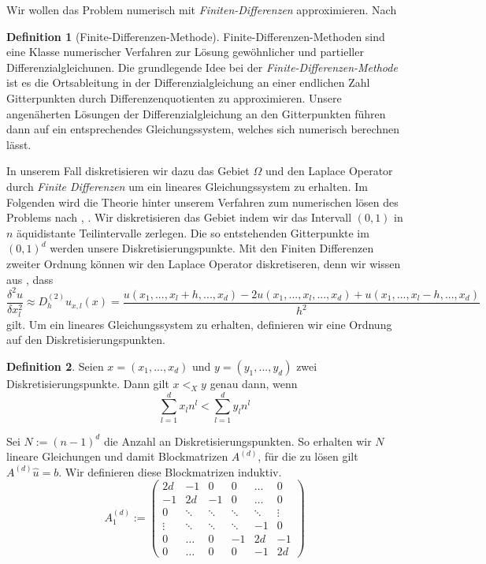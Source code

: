 \documentclass[smallheadings]{scrartcl}
\theoremstyle{definition}
\newtheorem{definition}{Definition}[section]
\begin{document}
		Wir wollen das Problem numerisch mit \textit{Finiten-Differenzen} approximieren. Nach \citep{finite}
		\begin{definition}[Finite-Differenzen-Methode]
		Finite-Differenzen-Methoden sind eine Klasse numerischer Verfahren zur Lösung gewöhnlicher und partieller Differenzialgleichunen.		
		Die grundlegende Idee bei der \textit{Finite-Differenzen-Methode} ist es die Ortsableitung in der Differenzialgleichung an einer endlichen Zahl Gitterpunkten durch Differenzenquotienten zu approximieren. Unsere angenäherten Lösungen der Differenzialgleichung an den Gitterpunkten führen dann auf ein entsprechendes Gleichungssystem, welches sich numerisch berechnen lässt.
		\end{definition}
		In unserem Fall diskretisieren wir dazu das Gebiet $\Omega$ und den Laplace Operator durch \textit{Finite Differenzen} um ein lineares Gleichungssystem zu erhalten.
		 Im Folgenden wird die Theorie hinter unserem Verfahren zum numerischen lösen des Problems nach \citep{PDE}, \citep{Wiki}. Wir diskretisieren das Gebiet indem wir das Intervall $(0,1)$ in $n$ äquidistante Teilintervalle zerlegen. Die so entstehenden Gitterpunkte im $(0,1)^d$ werden unsere Diskretisierungspunkte. Mit den Finiten Differenzen zweiter Ordnung können wir den Laplace Operator diskretiseren, denn wir wissen aus \citep{Wiki}, dass 
		$$\frac{\delta^2u}{\delta x_l^2} \approx D_h^{(2)} u_{x,l}(x) =\frac{u(x_1,...,x_l+h,...,x_d) - 2u(x_1,...,x_l,...,x_d) + u(x_1,...,x_l-h,...,x_d)}{h^2}$$
		gilt. 
		Um ein lineares Gleichungssystem zu erhalten, definieren wir eine Ordnung auf den Diskretisierungspunkten.
		\begin{definition}
		Seien $x=(x_1,...,x_d)$ und $y=(y_1,...,y_d)$ zwei Diskretisierungspunkte. Dann gilt $x <_X y$ genau dann, wenn
		$$\sum_{l=1}^dx_ln^l<\sum_{l=1}^dy_ln^l$$
		\end{definition}
		Sei $N:=(n-1)^d$ die Anzahl an Diskretisierungspunkten.
		So erhalten wir $N$ lineare Gleichungen und damit Blockmatrizen $A^{(d)}$, für die zu lösen gilt $A^{(d)}\hat{u}=b$. Wir definieren diese Blockmatrizen induktiv.
		$$A^{(d)}_{1} := \begin{pmatrix}     2d & -1 & 0 & 0 &\dots&0 \\    -1 & 2d & -1 & 0&\dots&0 \\    0&\ddots&\ddots&\ddots&\ddots&\vdots\\    \vdots & \ddots &\ddots&\ddots&-1&0 \\    0 & \dots&0&-1&2d&-1\\     0&  \dots&0&0&-1&2d    \end{pmatrix}$$
\end{document}
